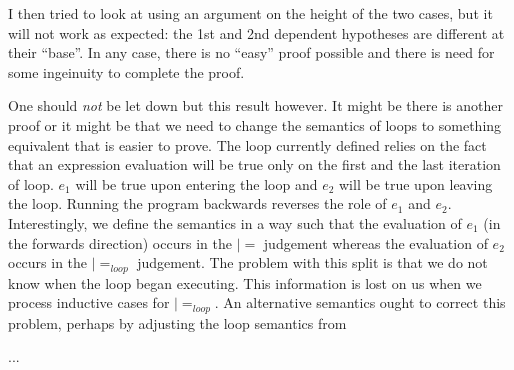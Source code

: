 I then tried to look at using an argument on the height of the two
cases, but it will not work as expected: the 1st and 2nd dependent
hypotheses are different at their ``base''. In any case, there is no
``easy'' proof possible and there is need for some ingeinuity to
complete the proof.

One should \emph{not} be let down but this result however. It might be
there is another proof or it might be that we need to change the
semantics of loops to something equivalent that is easier to
prove. The loop currently defined relies on the fact that an
expression evaluation will be true only on the first and the last
iteration of loop. $e_1$ will be true upon entering the loop and $e_2$
will be true upon leaving the loop. Running the program backwards
reverses the role of $e_1$ and $e_2$. Interestingly, we define the
semantics in a way such that the evaluation of $e_1$ (in the forwards
direction) occurs in the $|=$ judgement whereas the evaluation of
$e_2$ occurs in the $|=_{loop}$ judgement. The problem with this split
is that we do not know when the loop began executing. This information
is lost on us when we process inductive cases for $|=_{loop}$. An
alternative semantics ought to correct this problem, perhaps by
adjusting the loop semantics from \cite{glueck+2007}

...

